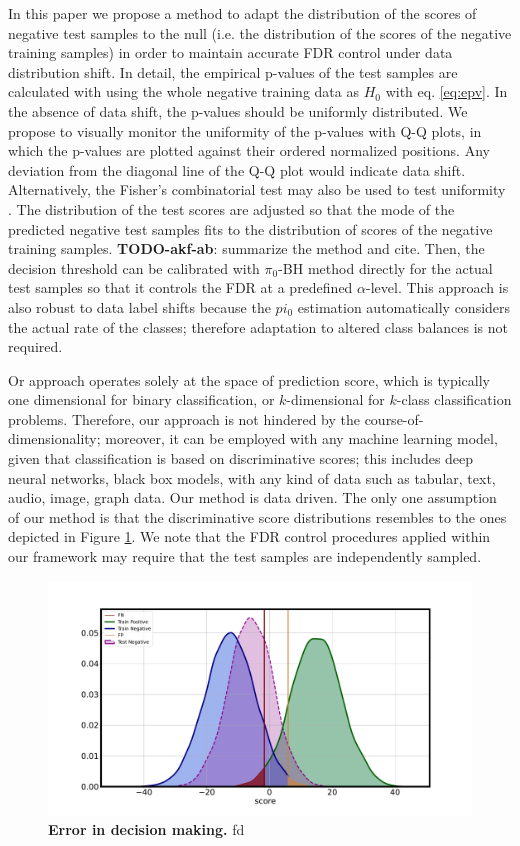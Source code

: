 \documentclass{article}
\newcommand{\todo}[2]{{\color{red} {\bf TODO-#1}: #2}}
\begin{document}
In this paper we propose a method to adapt the distribution of the scores of negative test samples to the null (i.e. the distribution of the scores of the negative training samples) in order to maintain accurate FDR control under data distribution shift. In detail, the empirical p-values of the test samples are calculated with using the whole negative training data as $H_0$ with eq. \ref{eq:epv}. In the absence of data shift, the p-values should be uniformly distributed. We propose to visually monitor the uniformity of the p-values with Q-Q plots, in which the p-values are plotted against their ordered normalized positions. Any deviation from the diagonal line of the Q-Q plot would indicate data shift. Alternatively, the Fisher's combinatorial test may also be used to test uniformity \cite{fisher1928statistical}. The distribution of the test scores are adjusted so that the mode of the predicted negative test samples fits to the distribution of scores of the negative training samples. \todo{akf-ab}{summarize the method and cite}. Then, the decision threshold can be calibrated with $\pi_0$-BH method directly for the actual test samples so that it controls the FDR at a predefined $\alpha$-level. This approach is also robust to data label shifts because the $pi_0$ estimation automatically considers the actual rate of the classes; therefore adaptation to altered class balances is not required.

 Or approach operates solely at the space of prediction score, which is typically one dimensional for binary classification, or $k$-dimensional for $k$-class classification problems. Therefore, our approach is not hindered by the course-of-dimensionality; moreover, it can be employed with any machine learning model, given that classification is based on discriminative scores; this includes deep neural networks, black box models, with any kind of data such as tabular, text, audio, image, graph data. Our method is data driven. The only one assumption of our method is that the discriminative score distributions resembles to the ones depicted in Figure \ref{fig:illustration}. We note that the FDR control procedures applied within our framework may require that the test samples are independently sampled.

\begin{figure}
	\centering
	\includegraphics[width=5in]{img/synthetic_overview.pdf}
	\caption{{\bf Error in decision making.} fd}
	\label{fig:illustration}
\end{figure}  
\end{document}
